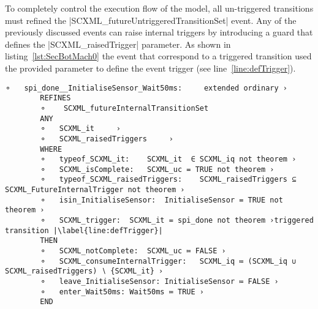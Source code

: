 To completely control the execution flow of the model, all un-triggered transitions must refined the |SCXML_futureUntriggeredTransitionSet|
event. Any of the previously discussed events can raise internal triggers by introducing a guard that defines the |SCXML_raisedTrigger| parameter. As shown in listing~\ref{lst:SecBotMach0} the event that correspond to a triggered transition used the provided parameter to define the event trigger (see line~\ref{line:defTrigger}).


\begin{lstlisting}[caption={Event-B event corresponding to internal triggered transition to \textbf{Wait50ms} state. This is the refinement level 1 shown in~\ref{fig:ASIC}}, label={lst:SecBotMach0},language=Event-B, escapechar=|, frame=single]
	⚬	spi_done__InitialiseSensor_Wait50ms:	 extended ordinary ›
		REFINES
		⚬	 SCXML_futureInternalTransitionSet 
		ANY
		⚬	SCXML_it	 ›
		⚬	SCXML_raisedTriggers	 ›
		WHERE
		⚬	typeof_SCXML_it:	SCXML_it  ∈ SCXML_iq not theorem ›
		⚬	SCXML_isComplete:	SCXML_uc = TRUE not theorem ›
		⚬	typeof_SCXML_raisedTriggers:	SCXML_raisedTriggers ⊆ SCXML_FutureInternalTrigger not theorem ›
		⚬	isin_InitialiseSensor:	InitialiseSensor = TRUE not theorem ›
		⚬	SCXML_trigger:	SCXML_it = spi_done not theorem ›triggered transition |\label{line:defTrigger}|
		THEN
		⚬	SCXML_notComplete:	SCXML_uc ≔ FALSE ›
		⚬	SCXML_consumeInternalTrigger:	SCXML_iq ≔ (SCXML_iq ∪ SCXML_raisedTriggers) ∖ {SCXML_it} ›
		⚬	leave_InitialiseSensor:	InitialiseSensor ≔ FALSE ›
		⚬	enter_Wait50ms:	Wait50ms ≔ TRUE ›
		END
\end{lstlisting}